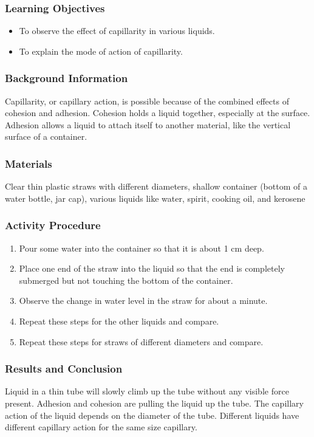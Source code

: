 \subsubsection*{Learning Objectives}
\begin{itemize}
\item{To observe the effect of capillarity in various liquids.} 
\item{To explain the mode of action of capillarity.} 
\end{itemize}

\subsubsection*{Background Information}
Capillarity, or capillary action, is possible because of the combined effects of cohesion and adhesion. Cohesion holds a liquid together, especially at the surface. Adhesion allows a liquid to attach itself to another material, like the vertical surface of a container. 

\subsubsection*{Materials}
Clear thin plastic straws with different diameters, shallow container (bottom of a water bottle, jar cap), various liquids like water, spirit, cooking oil, and kerosene 

\subsubsection*{Activity Procedure}
\begin{enumerate}
\item{Pour some water into the container so that it is about 1 cm deep.} 
\item{Place one end of the straw into the liquid so that the end is completely submerged but not touching the bottom of the container.} 
\item{Observe the change in water level in the straw for about a minute.} 
\item{Repeat these steps for the other liquids and compare.}
\item{Repeat these steps for straws of different diameters and compare.} 
\end{enumerate}

\subsubsection*{Results and Conclusion}
Liquid in a thin tube will slowly climb up the tube without any visible force present. Adhesion and cohesion are pulling the liquid up the tube. The capillary action of the liquid depends on the diameter of the tube. Different liquids have different capillary action for the same size capillary.

